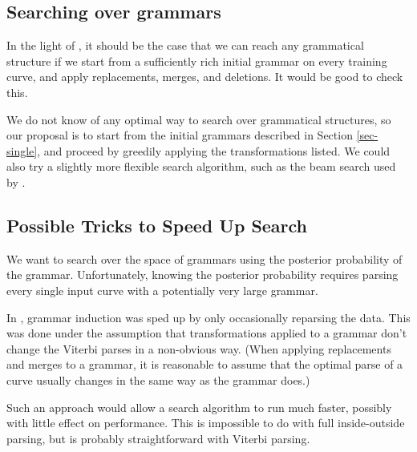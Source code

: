 \subsection{Searching over grammars}

In the light of \cite{stolcke}, it should be the case that we can
reach any grammatical structure if we start from a sufficiently rich
initial grammar on every training curve, and apply replacements,
merges, and deletions. It would be good to check this.

We do not know of any optimal way to search over grammatical
structures, so our proposal is to start from the initial grammars
described in Section \ref{sec-single}, and proceed by greedily applying the
transformations listed. We could also try a slightly more flexible
search algorithm, such as the beam search used by \cite{stolcke}.

\subsection{Possible Tricks to Speed Up Search}
We want to search over the space of grammars using the posterior
probability of the grammar. Unfortunately, knowing the posterior
probability requires parsing every single input curve with a
potentially very large grammar.

In \cite{stolcke}, grammar induction was sped up by only occasionally
reparsing the data. This was done under the assumption that
transformations applied to a grammar don't change the Viterbi parses
in a non-obvious way. (When applying replacements and merges to a
grammar, it is reasonable to assume that the optimal parse of a curve
usually changes in the same way as the grammar does.)

Such an approach would allow a search algorithm to run much faster,
possibly with little effect on performance. This is impossible to do
with full inside-outside parsing, but is probably straightforward with
Viterbi parsing.

